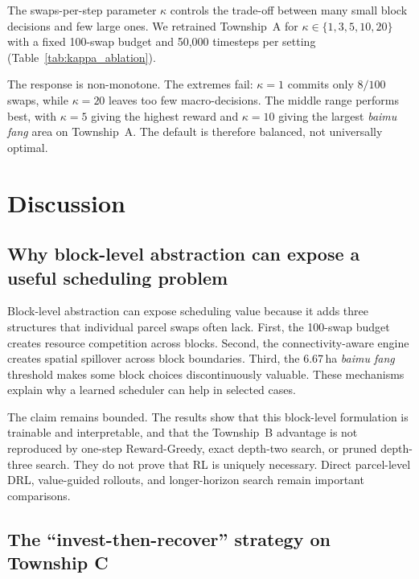 \documentclass[preprint,12pt]{elsarticle}
\begin{document}
The swaps-per-step parameter $\kappa$ controls the trade-off between many small block decisions and few large ones. We retrained Township~A for $\kappa\in\{1,3,5,10,20\}$ with a fixed 100-swap budget and 50{,}000 timesteps per setting (Table~\ref{tab:kappa_ablation}).



The response is non-monotone. The extremes fail: $\kappa=1$ commits only $8/100$ swaps, while $\kappa=20$ leaves too few macro-decisions. The middle range performs best, with $\kappa=5$ giving the highest reward and $\kappa=10$ giving the largest \textit{baimu fang} area on Township~A. The default is therefore balanced, not universally optimal.


\section{Discussion}
\label{sec:discussion}

\subsection{Why block-level abstraction can expose a useful scheduling problem}

Block-level abstraction can expose scheduling value because it adds three structures that individual parcel swaps often lack. First, the 100-swap budget creates resource competition across blocks. Second, the connectivity-aware engine creates spatial spillover across block boundaries. Third, the 6.67\,ha \textit{baimu fang} threshold makes some block choices discontinuously valuable. These mechanisms explain why a learned scheduler can help in selected cases.

The claim remains bounded. The results show that this block-level formulation is trainable and interpretable, and that the Township~B advantage is not reproduced by one-step Reward-Greedy, exact depth-two search, or pruned depth-three search. They do not prove that RL is uniquely necessary. Direct parcel-level DRL, value-guided rollouts, and longer-horizon search remain important comparisons.

\subsection{The ``invest-then-recover'' strategy on Township C}
\end{document}
